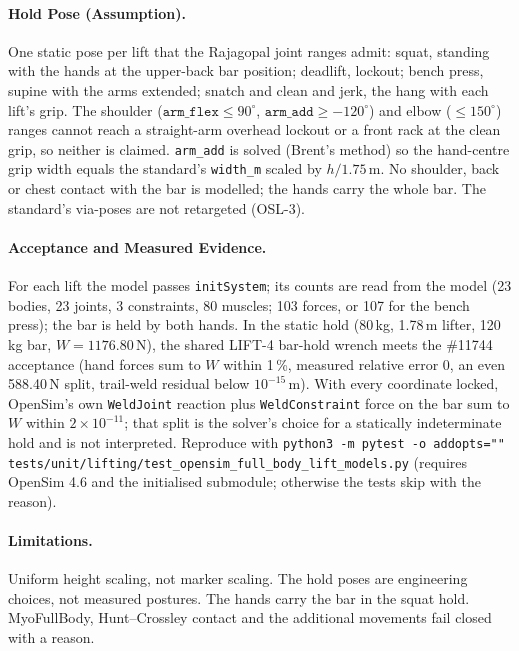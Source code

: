 \documentclass[11pt,a4paper]{article}
\begin{document}
\paragraph{Hold Pose (Assumption).} One static pose per lift that the
Rajagopal joint ranges admit: squat, standing with the hands at the
upper-back bar position; deadlift, lockout; bench press, supine with the arms
extended; snatch and clean and jerk, the hang with each lift's grip. The
shoulder ($\texttt{arm\_flex} \le 90^\circ$, $\texttt{arm\_add} \ge
-120^\circ$) and elbow ($\le 150^\circ$) ranges cannot reach a straight-arm
overhead lockout or a front rack at the clean grip, so neither is claimed.
\texttt{arm\_add} is solved (Brent's method) so the hand-centre grip width
equals the standard's \texttt{width\_m} scaled by $h / 1.75$\,m. No shoulder,
back or chest contact with the bar is modelled; the hands carry the whole
bar. The standard's via-poses are not retargeted (OSL-3).

\paragraph{Acceptance and Measured Evidence.} For each lift the model passes
\texttt{initSystem}; its counts are read from the model (23 bodies, 23 joints,
3 constraints, 80 muscles; 103 forces, or 107 for the bench press); the bar is
held by both hands. In the static hold (80\,kg, 1.78\,m lifter, 120\,kg bar,
$W = 1176.80$\,N), the shared LIFT-4 bar-hold wrench meets the \#11744
acceptance (hand forces sum to $W$ within 1\,\%, measured relative error 0,
an even 588.40\,N split, trail-weld residual below $10^{-15}$\,m). With every
coordinate locked, OpenSim's own \texttt{WeldJoint} reaction plus
\texttt{WeldConstraint} force on the bar sum to $W$ within $2 \times
10^{-11}$; that split is the solver's choice for a statically indeterminate
hold and is not interpreted. Reproduce with
\texttt{python3 -m pytest -o addopts="" tests/unit/lifting/test\_opensim\_full\_body\_lift\_models.py}
(requires OpenSim 4.6 and the initialised submodule; otherwise the tests skip
with the reason).

\paragraph{Limitations.} Uniform height scaling, not marker scaling. The
hold poses are engineering choices, not measured postures. The hands carry
the bar in the squat hold. MyoFullBody, Hunt--Crossley contact and the
additional movements fail closed with a reason.
\end{document}
